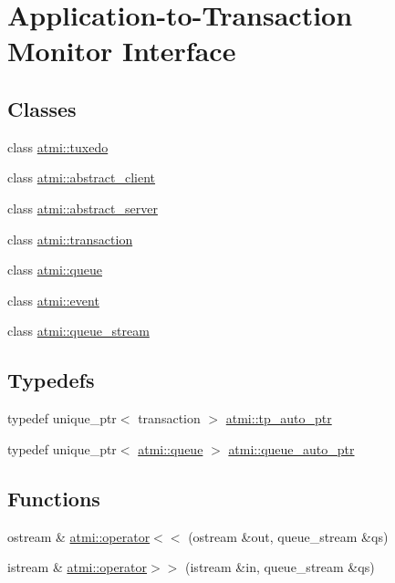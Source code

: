\hypertarget{group__atmi}{\section{Application-\/to-\/\+Transaction Monitor Interface}
\label{group__atmi}
}
\subsection*{Classes}
\begin{DoxyCompactItemize}
\item 
class \hyperlink{classatmi_1_1tuxedo}{atmi\+::tuxedo}
\item 
class \hyperlink{classatmi_1_1abstract__client}{atmi\+::abstract\+\_\+client}
\item 
class \hyperlink{classatmi_1_1abstract__server}{atmi\+::abstract\+\_\+server}
\item 
class \hyperlink{classatmi_1_1transaction}{atmi\+::transaction}
\item 
class \hyperlink{classatmi_1_1queue}{atmi\+::queue}
\item 
class \hyperlink{classatmi_1_1event}{atmi\+::event}
\item 
class \hyperlink{classatmi_1_1queue__stream}{atmi\+::queue\+\_\+stream}
\end{DoxyCompactItemize}
\subsection*{Typedefs}
\begin{DoxyCompactItemize}
\item 
typedef unique\+\_\+ptr$<$ transaction $>$ \hyperlink{group__atmi_ga4a71d76e59908eb5ec5e53269c2742b5}{atmi\+::tp\+\_\+auto\+\_\+ptr}
\item 
typedef unique\+\_\+ptr$<$ \hyperlink{classatmi_1_1queue}{atmi\+::queue} $>$ \hyperlink{group__atmi_ga9eff55eddc901da817f1b087613b18cc}{atmi\+::queue\+\_\+auto\+\_\+ptr}
\end{DoxyCompactItemize}
\subsection*{Functions}
\begin{DoxyCompactItemize}
\item 
ostream \& \hyperlink{group__atmi_gaf3fe9481b5d6e19d1fb56e27baff2154}{atmi\+::operator$<$$<$} (ostream \&out, queue\+\_\+stream \&qs)
\item 
istream \& \hyperlink{group__atmi_gadb0ca17e8de1eecddb5c95b86441ffdc}{atmi\+::operator$>$$>$} (istream \&in, queue\+\_\+stream \&qs)
\end{DoxyCompactItemize}


